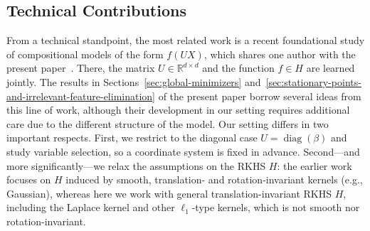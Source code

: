 \documentclass[sn-mathphys-num]{sn-jnl}%
\numberwithin{equation}{section}
\newcommand{\redblock}[1]{{\color{black}#1}}
\newcommand{\R}{\mathbb{R}}
\theoremstyle{thmstyleone}%
\theoremstyle{thmstyletwo}%
\theoremstyle{thmstylethree}%
\begin{document}
\redblock{
\subsection{Technical Contributions} 
\label{sec:technical-contributions}
\indent\indent
From a technical standpoint, the most related work is a recent foundational study of compositional models of the form $f(UX)$, which shares one author with the present paper~\cite{LiRu25, LiRub25}. There, the matrix $U \in \R^{d \times d}$ and the function $f \in H$ are learned jointly. The results in Sections~\ref{sec:global-minimizers} and~\ref{sec:stationary-points-and-irrelevant-feature-elimination} of the present paper borrow several ideas from this line of work, although their development in our setting requires additional care due to the different structure of the model. Our setting differs in two important respects. First, we restrict to the diagonal case $U=\operatorname{diag}(\beta)$ and study variable selection, so a coordinate system is fixed in advance. Second—and more significantly—we relax the assumptions on the RKHS $H$: the earlier work focuses on $H$ induced by smooth, translation- and rotation-invariant kernels (e.g., Gaussian), whereas here we work with general translation-invariant RKHS $H$, including the Laplace kernel and other $\ell_1$-type kernels, which is not smooth nor rotation-invariant.




}
\end{document}
